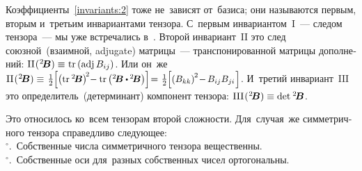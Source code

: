 \begin{otherlanguage}{russian}
Коэффициенты~\eqref{invariants:2} тоже не~зависят от~базиса; они называются первым, вторым и~третьим инвариантами тензора.
С~первым инвариантом~${\mathrm{I}}$~--- следом тензора~--- мы уже встречались в~.
Второй инвариант~${\mathrm{II}}$ это след союзной~(взаимной, adjugate) матрицы~--- транспонированной матрицы дополнений: ${\mathrm{II}\hspace{.16ex}(\hspace{.1ex}{^2\!\bm{B}}) \equiv \hspace{.1ex} \operatorname{tr} \left({\operatorname{adj}{B_{ij}}}\right)}$.
Или он~же \hbox{${\mathrm{II}\hspace{.16ex}(\hspace{.1ex}{^2\!\bm{B}}) \equiv \hspace{.2ex} \textstyle \onehalf \hspace{-0.08ex} \scalebox{0.96}[0.96]{$\left[ \left(\operatorname{tr}\hspace{.1ex} {^2\!\bm{B}}\right)^{\!2} \hspace{-0.5ex} - \operatorname{tr} \left( {^2\!\bm{B}} \dotp \hspace{-0.1ex} {^2\!\bm{B}} \right) \right]$} \hspace{-0.4ex} = \hspace{.1ex} \textstyle \onehalf \hspace{-0.08ex} \scalebox{0.96}[0.96]{$\left[ \left( B_{kk} \right)^{\hspace{-0.1ex}2} \hspace{-0.4ex} - \hspace{-0.2ex} B_{ij} B_{ji} \hspace{.2ex}\right]$}}$\hspace{-0.25ex}}.
И~третий инвариант~${\mathrm{III}}$ это определитель~(детерминант) компонент тензора: %
${\mathrm{III}\hspace{.16ex}(\hspace{.1ex}{^2\!\bm{B}}) \equiv \operatorname{det}\hspace{.1ex} {^2\!\bm{B}}}$.

Это относилось ко~всем тензорам второй сложности. Для~случая~же симметричного тензора справедливо следующее:\\
$^{\circ}$\hspace{-1ex}.\, Собственные числа симметричного тензора вещественны.\\
$^{\circ}$\hspace{-1ex}.\, Собственные оси для~разных собственных чисел ортогональны.


\end{otherlanguage}
